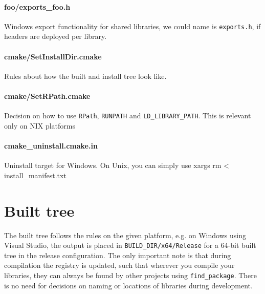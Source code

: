 \documentclass[12pt,a4wide]{article}
\begin{document}
\paragraph{\ttfamily foo/exports\_foo.h} Windows export functionality for
  shared libraries, we could name is \lstinline{exports.h}, if headers
  are deployed per library.
\paragraph{\ttfamily cmake/SetInstallDir.cmake} Rules about how the built
  and install tree look like.
\paragraph{\ttfamily cmake/SetRPath.cmake} Decision on how to use \lstinline{RPath},
  \lstinline{RUNPATH} and \lstinline{LD_LIBRARY_PATH}. This is
  relevant only on NIX platforms
\paragraph{\ttfamily cmake\_uninstall.cmake.in} Uninstall target for
Windows. On Unix, you can simply use {\ttfamily xargs rm < install\_manifest.txt}

\section{Built tree}
The built tree follows the rules on the given platform, e.g. on
Windows using Visual Studio, the output is placed in
\lstinline{BUILD_DIR/x64/Release} for a 64-bit built tree in the
release configuration. The only important note is that during
compilation the registry is updated, such that wherever you compile
your libraries, they can always be found by other projects using
\lstinline{find_package}. There is no need for decisions on naming or
locations of libraries during development.
\end{document}
